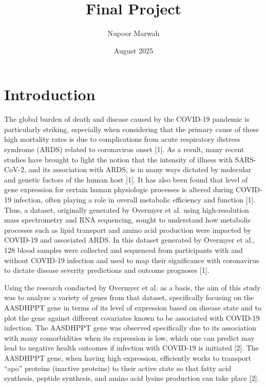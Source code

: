 \documentclass{article}
\title{Final Project}
\author{Nupoor Marwah}
\date{August 2025}
\begin{document}
\newpage

\maketitle

\tableofcontents

\maketitle
\newpage
\section{Introduction}
The global burden of death and disease caused by the COVID-19 pandemic is particularly striking, especially when considering that the primary cause of these high mortality rates is due to complications from acute respiratory distress syndrome (ARDS) related to coronavirus onset [1]. As a result, many recent studies have brought to light the notion that the intensity of illness with SARS-CoV-2, and its association with ARDS, is in many ways dictated by molecular and genetic factors of the human host [1]. It has also been found that level of gene expression for certain human physiologic processes is altered during COVID-19 infection, often playing a role in overall metabolic efficiency and function [1]. Thus, a dataset, originally generated by Overmyer et al. using high-resolution mass spectrometry and RNA sequencing, sought to understand how metabolic processes such as lipid transport and amino acid production were impacted by COVID-19 and associated ARDS. In this dataset generated by Overmyer et al., 128 blood samples were collected and sequenced from participants with and without COVID-19 infection and used to map their significance with coronavirus to dictate disease severity predictions and outcome prognoses [1]. \par

Using the research conducted by Overmyer et al. as a basis, the aim of this study was to analyze a variety of genes from that dataset, specifically focusing on the AASDHPPT gene in terms of its level of expression based on disease state and to plot the gene against different covariates known to be associated with COVID-19 infection. The AASDHPPT gene was observed specifically due to its association with many comorbidities when its expression is low, which one can predict may lead to negative health outcomes if infection with COVID-19 is initiated [2]. The AASDHPPT gene, when having high expression, efficiently works to transport “apo” proteins (inactive proteins) to their active state so that fatty acid synthesis, peptide synthesis, and amino acid lysine production can take place [2].
\end{document}
